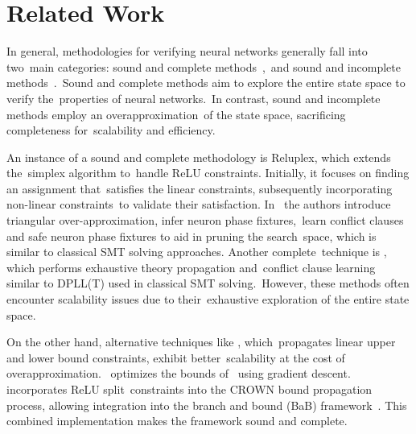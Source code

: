 \section{Related Work}

In general, methodologies for verifying neural networks generally fall into two main categories: sound and complete methods \cite{reluplex,formal-ver-piece-wise,comp-reachability-analysis,comp-milp,comp-out-range,comp-max-resilience,marabou,comp-safety-ver-dnn,beta-crown,alpha-crown-bab-fnc,gcp-crown}, and sound and incomplete methods \cite{deeppoly,crown,incomp-dual-approach,incomp-abs-inp,incomp-robustness-certi,incomp-boost-robustness}. Sound and complete methods aim to explore the entire state space to verify the properties of neural networks. In contrast, sound and incomplete methods employ an overapproximation of the state space, sacrificing completeness for scalability and efficiency.

An instance of a sound and complete methodology is Reluplex, which extends the simplex algorithm \cite{simplex} to handle ReLU constraints. Initially, it focuses on finding an assignment that satisfies the linear constraints, subsequently incorporating non-linear constraints to validate their satisfaction. In \cite{formal-ver-piece-wise} the authors introduce triangular over-approximation, infer neuron phase fixtures, learn conflict clauses and safe neuron phase fixtures to aid in pruning the search space, which is similar to classical SMT solving approaches. Another complete technique is \neuralsat, which performs exhaustive theory propagation and conflict clause learning similar to DPLL(T) used in classical SMT solving. However, these methods often encounter scalability issues due to their exhaustive exploration of the entire state space.

On the other hand, alternative techniques like \cite{crown,deeppoly}, which propagates linear upper and lower bound constraints, exhibit better scalability at the cost of overapproximation. \cite{alpha-crown-bab-fnc} optimizes the bounds of \cite{crown} using gradient descent. \cite{beta-crown} incorporates ReLU split constraints into the CROWN bound propagation process, allowing integration
into the branch and bound (BaB) framework \cite{bab-fw,bab-piecewise-nn,bab-lagrangian-decomp}.
This combined implementation makes the \abcrown framework sound and complete.


